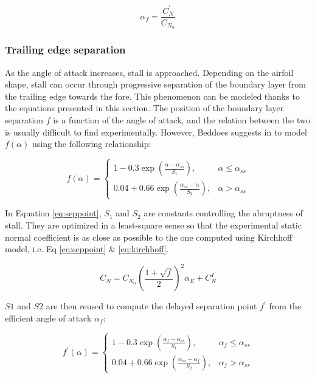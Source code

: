 \begin{equation}
\alpha_f = \frac{C_N^{\prime}}{C_{N_\alpha}}
\label{eq:equivalent_alpha}
\end{equation}

\subsubsection{Trailing edge separation}
As the angle of attack increases, stall is approached. Depending on the airfoil shape, stall can occur through progressive separation of the boundary layer from the trailing edge towards the fore. This phenomenon can be modeled thanks to the equations presented in this section. 
The position of the boundary layer separation $f$ is a function of the angle of attack, and the relation between the two is usually difficult to find experimentally. However, Beddoes suggests in \autocite{beddoes_representation_1983} to model $f(\alpha)$ using the following relationship:

\begin{equation}
f(\alpha)=\left\{\begin{array}{ll}
1-0.3 \exp \left(\frac{\alpha-\alpha_{ss}}{S_{1}}\right), & \alpha \leq \alpha_{ss} \\
0.04+0.66 \exp \left(\frac{\alpha_{ss}-\alpha}{S_{2}}\right), & \alpha >\alpha_{ss}
\end{array}\right.
\label{eq:seppoint}
\end{equation}

In Equation \eqref{eq:seppoint}, $S_1$ and $S_2$ are constants controlling the abruptness of stall. They are optimized in a least-square sense so that the experimental static normal coefficient is as close as possible to the one computed using Kirchhoff model, i.e. Eq \eqref{eq:seppoint} \& \eqref{eq:kirchhoff}. 

\begin{equation}
C_{N} = C_{N_{\alpha}}\left(\frac{1+\sqrt{f}}{2}\right)^{2} \alpha_{E}+C_{N}^{I}
\label{eq:kirchhoff}
\end{equation}

$S1$ and $S2$ are then reused to compute the delayed separation point $f^{\prime}$ from the efficient angle of attack $\alpha_f$:

\begin{equation}
f^{\prime}(\alpha)=\left\{\begin{array}{ll}
1-0.3 \exp \left(\frac{\alpha_{f}-\alpha_{ss}}{S_{1}}\right), & \alpha_{f} \leq \alpha_{ss} \\
0.04+0.66 \exp \left(\frac{\alpha_{ss}-\alpha_{f}}{S_{2}}\right), & \alpha_{f}>\alpha_{ss}
\end{array}\right.
\end{equation}


